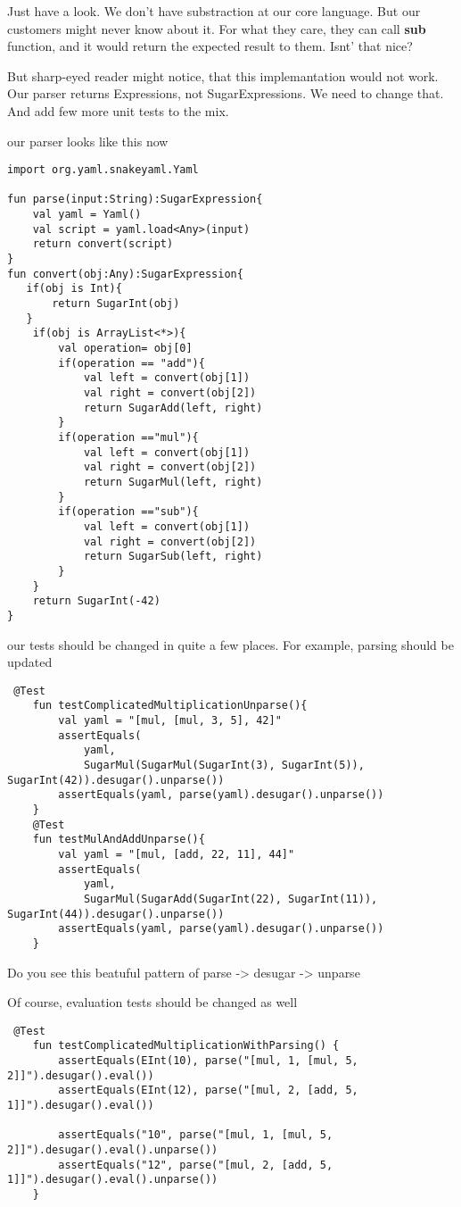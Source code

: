 \documentclass[11pt]{article}
\begin{document}
Just have a look.
We don't have substraction at our core language. But our customers might never know about it.
For what they care, they can call \textbf{sub} function, and it would return the expected result to them.
Isnt' that nice?

But sharp-eyed reader might notice, that this implemantation would not work.
Our parser returns Expressions, not SugarExpressions. We need to change that.
And add few more unit tests to the mix.

our parser looks like this now
\begin{verbatim}
import org.yaml.snakeyaml.Yaml

fun parse(input:String):SugarExpression{
    val yaml = Yaml()
    val script = yaml.load<Any>(input)
    return convert(script)
}
fun convert(obj:Any):SugarExpression{
   if(obj is Int){
       return SugarInt(obj)
   }
    if(obj is ArrayList<*>){
        val operation= obj[0]
        if(operation == "add"){
            val left = convert(obj[1])
            val right = convert(obj[2])
            return SugarAdd(left, right)
        }
        if(operation =="mul"){
            val left = convert(obj[1])
            val right = convert(obj[2])
            return SugarMul(left, right)
        }
        if(operation =="sub"){
            val left = convert(obj[1])
            val right = convert(obj[2])
            return SugarSub(left, right)
        }
    }
    return SugarInt(-42)
}
\end{verbatim}

our tests should be changed in quite a few places. For example, parsing should be updated
\begin{verbatim}
 @Test
    fun testComplicatedMultiplicationUnparse(){
        val yaml = "[mul, [mul, 3, 5], 42]"
        assertEquals(
            yaml,
            SugarMul(SugarMul(SugarInt(3), SugarInt(5)), SugarInt(42)).desugar().unparse())
        assertEquals(yaml, parse(yaml).desugar().unparse())
    }
    @Test
    fun testMulAndAddUnparse(){
        val yaml = "[mul, [add, 22, 11], 44]"
        assertEquals(
            yaml,
            SugarMul(SugarAdd(SugarInt(22), SugarInt(11)), SugarInt(44)).desugar().unparse())
        assertEquals(yaml, parse(yaml).desugar().unparse())
    }
\end{verbatim}
Do you see this beatuful pattern of parse -> desugar -> unparse

Of course, evaluation tests should be changed as well
\begin{verbatim}
 @Test
    fun testComplicatedMultiplicationWithParsing() {
        assertEquals(EInt(10), parse("[mul, 1, [mul, 5, 2]]").desugar().eval())
        assertEquals(EInt(12), parse("[mul, 2, [add, 5, 1]]").desugar().eval())

        assertEquals("10", parse("[mul, 1, [mul, 5, 2]]").desugar().eval().unparse())
        assertEquals("12", parse("[mul, 2, [add, 5, 1]]").desugar().eval().unparse())
    }
\end{verbatim}
\end{document}

